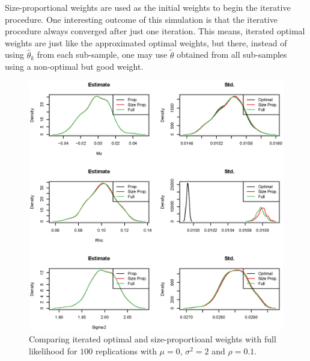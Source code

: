 \documentclass[11pt,a5paper,twoside]{book}
\begin{document}
{Size-proportional weights are used as the initial weights to begin the iterative procedure. One interesting outcome of this simulation is that the iterative procedure always converged after just one iteration. This means, iterated optimal weights are just like the approximated optimal weights, but there, instead of using $\widehat{\theta}_k$ from each sub-sample, one may use $\tilde{\theta}$ obtained from all sub-samples using a non-optimal but good weight.

\begin{figure}[ht!]
\centering
\includegraphics[width=\textwidth]{rho1_opt.eps}
\caption{Comparing iterated optimal and size-proportioanl weights with full likelihood for $100$ replications with $\mu=0$, $\sigma^2=2$ and $\rho=0.1$.} \label{fig_rho1_opt}
\end{figure}

}
\end{document}
